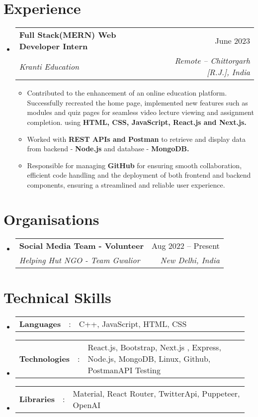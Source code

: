 \documentclass[a4paper,11pt]{article}
\makeatletter
\newcommand{\resumeItem}[1]{
  \item\small{#1}
}
\newcommand{\resumeItemListStart}{\begin{itemize}[rightmargin=0.11in]}
\newcommand{\resumeItemListEnd}{\end{itemize}}
\newcommand{\resumeSectionType}[3]{
  \item\begin{tabular*}{0.96\textwidth}[t]{
    p{0.14\linewidth}p{0.02\linewidth}p{0.8\linewidth}
  }
    \textbf{#1} & #2 & #3
  \end{tabular*}\vspace{-7pt}
}
\newcommand{\resumeQuadHeading}[4]{
  \item
  \begin{tabular*}{0.96\textwidth}[t]{l@{\extracolsep{\fill}}r}
    \textbf{#1} & #2 \\
    \textit{\small#3} & \textit{\small #4} \\
  \end{tabular*}
}
\newcommand{\resumeHeadingListStart}{
  \begin{itemize}[leftmargin=0.15in, label={}]
}
\newcommand{\resumeHeadingListEnd}{\end{itemize}}
\makeatother
\begin{document}
\section{Experience}
\resumeHeadingListStart{}
  \resumeQuadHeading{Full Stack(MERN) Web Developer Intern}{June 2023}
  {Kranti Education}{Remote -- Chittorgarh [R.J.], India}
    \resumeItemListStart{}
      \resumeItem{Contributed to the enhancement of an online education platform. Successfully recreated the home page, implemented new features such as modules and quiz pages for seamless video lecture viewing and assignment completion. using \textbf{HTML, CSS, JavaScript, React.js and Next.js.}}
      \resumeItem{Worked with \textbf{REST APIs and Postman} to retrieve and display data from backend - \textbf{Node.js} and database - \textbf{MongoDB.}}
      \resumeItem{Responsible for managing \textbf{GitHub} for ensuring smooth collaboration, efficient code handling and the deployment of both frontend and backend components, ensuring a streamlined and reliable user experience.}
    \resumeItemListEnd{}

  
\resumeHeadingListEnd{}



\section{Organisations}
\resumeHeadingListStart{}
  \resumeQuadHeading{Social Media Team - Volunteer}{Aug 2022 -- Present}
  {Helping Hut NGO - Team Gwalior}{ New Delhi, India}  
\resumeHeadingListEnd{}



\section{Technical Skills}
  \resumeHeadingListStart{}
    \resumeSectionType{Languages}{:}{C++, JavaScript, HTML, CSS}
    \resumeSectionType{Technologies}{:}{React.js, Bootstrap, Next.js , Express, Node.js, MongoDB, Linux, Github, PostmanAPI Testing}
    \resumeSectionType{Libraries}{:}{Material, React Router, TwitterApi, Puppeteer, OpenAI}
  \resumeHeadingListEnd{}



\end{document}
